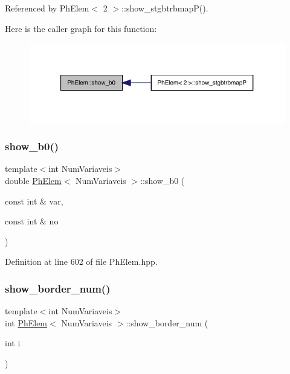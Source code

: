 Referenced by Ph\+Elem$<$ 2 $>$\+::show\+\_\+stgbtrbmap\+P().

Here is the caller graph for this function\+:
\nopagebreak
\begin{figure}[H]
\begin{center}
\leavevmode
\includegraphics[width=321pt]{classPhElem_a0caf55d9fac7477102ee34373c67a024_icgraph}
\end{center}
\end{figure}
\mbox{\label{classPhElem_afb4171c67795f5614d9628d59f3bfaf7}} 
\subsubsection{\texorpdfstring{show\+\_\+b0()}{show\_b0()}\hspace{0.1cm}{\footnotesize\ttfamily [2/2]}}
{\footnotesize\ttfamily template$<$int Num\+Variaveis$>$ \\
double \hyperlink{classPhElem}{Ph\+Elem}$<$ Num\+Variaveis $>$\+::show\+\_\+b0 (\begin{DoxyParamCaption}\item[{const int \&}]{var,  }\item[{const int \&}]{no }\end{DoxyParamCaption})}



Definition at line 602 of file Ph\+Elem.\+hpp.

\mbox{\label{classPhElem_a13564919b6d9747f0e6b33f3e8aae31b}} 
\subsubsection{\texorpdfstring{show\+\_\+border\+\_\+num()}{show\_border\_num()}}
{\footnotesize\ttfamily template$<$int Num\+Variaveis$>$ \\
int \hyperlink{classPhElem}{Ph\+Elem}$<$ Num\+Variaveis $>$\+::show\+\_\+border\+\_\+num (\begin{DoxyParamCaption}\item[{int}]{i }\end{DoxyParamCaption})\hspace{0.3cm}{\ttfamily [inline]}}



